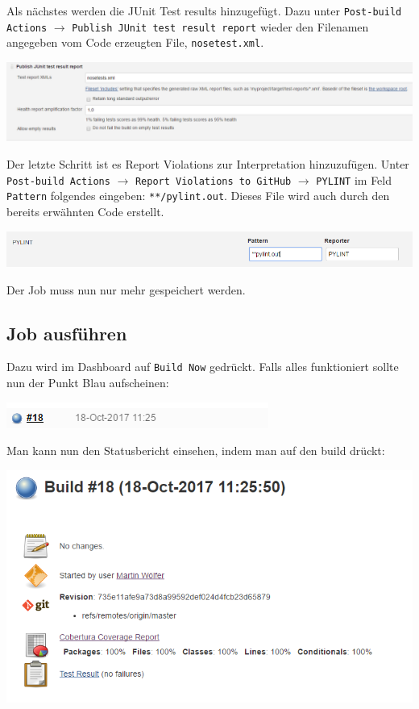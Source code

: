 Als nächstes werden die JUnit Test results hinzugefügt. Dazu unter \verb|Post-build Actions| $\rightarrow$ \verb|Publish JUnit test result report| wieder den Filenamen angegeben vom Code erzeugten File, \verb|nosetest.xml|.

\begin{minipage}{\linewidth}
	\centering
	\includegraphics[width=0.8\linewidth]{images/junit_tests}
\end{minipage}

Der letzte Schritt ist es Report Violations zur Interpretation hinzuzufügen. Unter \verb|Post-build Actions| $\rightarrow$ \verb|Report Violations to GitHub| $\rightarrow$ \verb|PYLINT| im Feld \verb|Pattern| folgendes eingeben: \verb|**/pylint.out|. Dieses File wird auch durch den bereits erwähnten Code erstellt.

\begin{minipage}{\linewidth}
	\centering
	\includegraphics[width=0.8\linewidth]{images/report_violations}
\end{minipage}

Der Job muss nun nur mehr gespeichert werden.

\subsection{Job ausführen}
Dazu wird im Dashboard auf \verb|Build Now| gedrückt. Falls alles funktioniert sollte nun der Punkt Blau aufscheinen:

\begin{minipage}{\linewidth}
	\centering
	\includegraphics[width=0.5\linewidth]{images/run_job}
\end{minipage}

Man kann nun den Statusbericht einsehen, indem man auf den build drückt:

\begin{minipage}{\linewidth}
	\centering
	\includegraphics[width=0.8\linewidth]{images/status_report}
\end{minipage}

